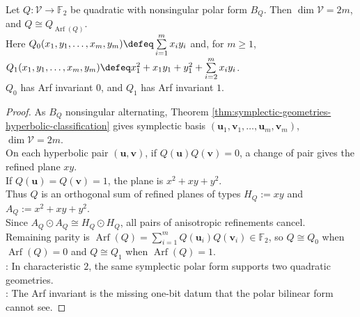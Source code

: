 \begin{theorem} \label{thm:f2-quadratic-refinements-arf-classification} \\
Let $Q:\mathcal{V}\to\mathbb{F}_2$ be quadratic with nonsingular polar form $B_Q$. Then $\dim\mathcal{V}=2m$, and $Q\cong Q_{\operatorname{Arf}(Q)}$.\\
Here $Q_0(x_1,y_1,\ldots,x_m,y_m) \defeq\sum\limits_{i=1}^{m}x_iy_i$ and, for $m\geq1$, $Q_1(x_1,y_1,\ldots,x_m,y_m) \defeq x_1^2+x_1y_1+y_1^2+\sum\limits_{i=2}^{m}x_iy_i$.\\
$Q_0$ has Arf invariant $0$, and $Q_1$ has Arf invariant $1$.
\begin{proof} As $B_Q$ nonsingular alternating, Theorem \ref{thm:symplectic-geometries-hyperbolic-classification} gives symplectic basis $(\mathbf{u}_1,\mathbf{v}_1,\ldots,\mathbf{u}_m,\mathbf{v}_m)$, $\dim\mathcal{V}=2m$.\\
On each hyperbolic pair $(\mathbf{u},\mathbf{v})$, if $Q(\mathbf{u})Q(\mathbf{v})=0$, a change of pair gives the refined plane $xy$.\\
If $Q(\mathbf{u})=Q(\mathbf{v})=1$, the plane is $x^2+xy+y^2$.\\
Thus $Q$ is an orthogonal sum of refined planes of types $H_Q:=xy$ and $A_Q:=x^2+xy+y^2$.\\
Since $A_Q\odot A_Q\cong H_Q\odot H_Q$, all pairs of anisotropic refinements cancel.\\
Remaining parity is $\operatorname{Arf}(Q)=\sum\limits_{i=1}^{m}Q(\mathbf{u}_i)Q(\mathbf{v}_i)\in\mathbb{F}_2$, so $Q\cong Q_0$ when $\operatorname{Arf}(Q)=0$ and $Q\cong Q_1$ when $\operatorname{Arf}(Q)=1$.\\
: In characteristic $2$, the same symplectic polar form supports two quadratic geometries.\\
: The Arf invariant is the missing one-bit datum that the polar bilinear form cannot see.
\end{proof}
\end{theorem}

